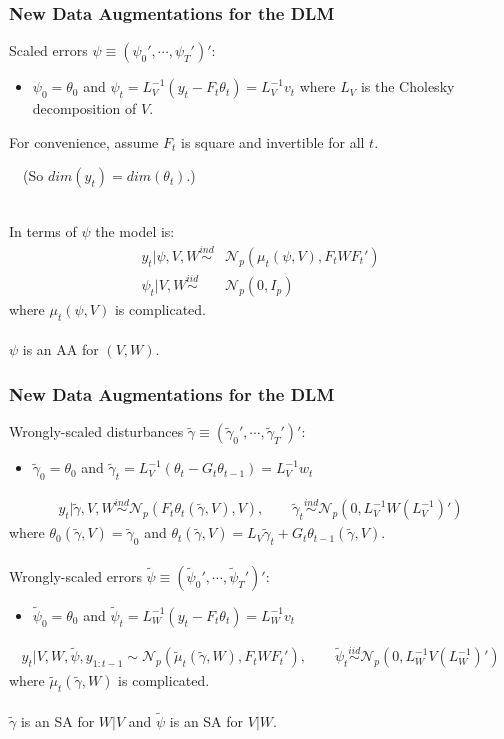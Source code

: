 \documentclass[xcolor=dvipsnames]{beamer}
\newcommand\N{\mathcal{N}}
\begin{document}
\begin{frame}
\frametitle{New Data Augmentations for the DLM}
Scaled errors $\psi\equiv(\psi_0',\cdots,\psi_T')'$:
\begin{itemize}
\item[]$\psi_0=\theta_0$ and $\psi_t=L_V^{-1}(y_t - F_t\theta_t)=L_V^{-1}v_t$ where $L_V$ is the Cholesky decomposition of $V$.
\end{itemize}
For convenience, assume $F_t$ is square and invertible for all $t$.
 
\ \ (So $dim(y_t)=dim(\theta_t)$.)\\~

In terms of $\psi$ the model is:
\begin{align*}
y_t|\psi,V,W \stackrel{ind}{\sim} &\N_p(\mu_t(\psi,V),F_tWF_t')\\
\psi_t|V,W \stackrel{iid}{\sim} &\N_p(0,I_p)
\end{align*} 
where $\mu_t(\psi,V)$ is complicated.\\~\\

{\color{blue}$\psi$ is an AA for $(V,W)$.}
\end{frame}

\begin{frame}
\frametitle{New Data Augmentations for the DLM}
Wrongly-scaled disturbances $\tilde{\gamma}\equiv(\tilde{\gamma}_0',\cdots,\tilde{\gamma}_T')'$:
\begin{itemize}
\item[]$\tilde{\gamma}_0=\theta_0$ and $\tilde{\gamma}_t=L_V^{-1}(\theta_t - G_t\theta_{t-1})=L_V^{-1}w_t$
\end{itemize}
\begin{align*}
  y_t|\tilde{\gamma},V,W \stackrel{ind}{\sim} \N_p\left(F_t\theta_t(\tilde{\gamma},V), V\right), \qquad 
  \tilde{\gamma}_t \stackrel{ind}{\sim} \N_p(0,L_V^{-1}W(L_V^{-1})')
\end{align*}
where $\theta_0(\tilde{\gamma},V)=\tilde{\gamma}_0$ and $\theta_t(\tilde{\gamma},V) = L_V\tilde{\gamma}_t + G_t\theta_{t-1}(\tilde{\gamma},V)$.\\~\\

Wrongly-scaled errors $\tilde{\psi}\equiv(\tilde{\psi}_0',\cdots,\tilde{\psi}_T')'$:
\begin{itemize}
\item[]$\tilde{\psi}_0=\theta_0$ and $\tilde{\psi}_t=L_W^{-1}(y_t - F_t\theta_{t})=L_W^{-1}v_t$
\end{itemize}
\begin{align*}
  y_t|V,W,\tilde{\psi},y_{1:t-1} \sim \N_p(\tilde{\mu}_t(\tilde{\gamma},W), F_tWF_t'), \qquad
  \tilde{\psi}_t  \stackrel{iid}{\sim} \N_p(0,L_W^{-1}V(L_W^{-1})')
\end{align*}
where $\tilde{\mu}_t(\tilde{\gamma},W)$ is complicated.\\~\\

{\color{blue} $\tilde{\gamma}$ is an SA for $W|V$ and $\tilde{\psi}$ is an SA for $V|W$.}
\end{frame}
\end{document}

